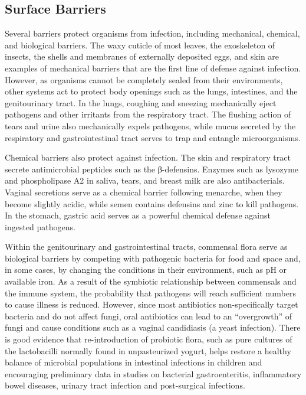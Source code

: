 \hypertarget{surface-barriers}{%
\subsection{Surface Barriers}\label{surface-barriers}}

Several barriers protect organisms from infection, including mechanical, chemical, and biological barriers. The waxy cuticle of most leaves, the exoskeleton of insects, the shells and membranes of externally deposited eggs, and skin are examples of mechanical barriers that are the first line of defense against infection. However, as organisms cannot be completely sealed from their environments, other systems act to protect body openings such as the lungs, intestines, and the genitourinary tract. In the lungs, coughing and sneezing mechanically eject pathogens and other irritants from the respiratory tract. The flushing action of tears and urine also mechanically expels pathogens, while mucus secreted by the respiratory and gastrointestinal tract serves to trap and entangle microorganisms.

Chemical barriers also protect against infection. The skin and respiratory tract secrete antimicrobial peptides such as the β-defensins. Enzymes such as lysozyme and phospholipase A2 in saliva, tears, and breast milk are also antibacterials. Vaginal secretions serve as a chemical barrier following menarche, when they become slightly acidic, while semen contains defensins and zinc to kill pathogens. In the stomach, gastric acid serves as a powerful chemical defense against ingested pathogens.

Within the genitourinary and gastrointestinal tracts, commensal flora serve as biological barriers by competing with pathogenic bacteria for food and space and, in some cases, by changing the conditions in their environment, such as pH or available iron. As a result of the symbiotic relationship between commensals and the immune system, the probability that pathogens will reach sufficient numbers to cause illness is reduced. However, since most antibiotics non-specifically target bacteria and do not affect fungi, oral antibiotics can lead to an ``overgrowth'' of fungi and cause conditions such as a vaginal candidiasis (a yeast infection). There is good evidence that re-introduction of probiotic flora, such as pure cultures of the lactobacilli normally found in unpasteurized yogurt, helps restore a healthy balance of microbial populations in intestinal infections in children and encouraging preliminary data in studies on bacterial gastroenteritis, inflammatory bowel diseases, urinary tract infection and post-surgical infections.

